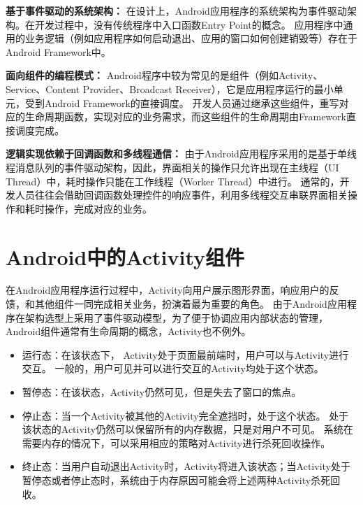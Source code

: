 \textbf{基于事件驱动的系统架构：}
在设计上，Android应用程序的系统架构为事件驱动架构。在开发过程中，没有传统程序中入口函数Entry Point的概念。
应用程序中通用的业务逻辑（例如应用程序如何启动退出、应用的窗口如何创建销毁等）存在于Android Framework中。

\textbf{面向组件的编程模式：}
Android程序中较为常见的是组件（例如Activity、Service、Content Provider、Broadcast Receiver），它是应用程序运行的最小单元，受到Android Framework的直接调度。
开发人员通过继承这些组件，重写对应的生命周期函数，实现对应的业务需求，而这些组件的生命周期由Framework直接调度完成。

\textbf{逻辑实现依赖于回调函数和多线程通信：}
由于Android应用程序采用的是基于单线程消息队列的事件驱动架构，因此，界面相关的操作只允许出现在主线程（UI Thread）中，耗时操作只能在工作线程（Worker Thread）中进行。
通常的，开发人员往往会借助回调函数处理控件的响应事件，利用多线程交互串联界面相关操作和耗时操作，完成对应的业务。


\section{Android中的Activity组件}



在Android应用程序运行过程中，Activity向用户展示图形界面，响应用户的反馈，和其他组件一同完成相关业务，扮演着最为重要的角色。%
由于Android应用程序在架构选型上采用了事件驱动模型，为了便于协调应用内部状态的管理，Android组件通常有生命周期的概念，Activity也不例外。




\begin{itemize}
		\setlength{\itemsep}{-5pt}
		
	\item 运行态：在该状态下， Activity处于页面最前端时，用户可以与Activity进行交互。
	一般的，用户可见并可以进行交互的Activity均处于这个状态。
	
	\item 暂停态：在该状态，Activity仍然可见，但是失去了窗口的焦点。
	\item 停止态：当一个Activity被其他的Activity完全遮挡时，处于这个状态。
	处于该状态的Activity仍然可以保留所有的内存数据，只是对用户不可见。
	系统在需要内存的情况下，可以采用相应的策略对Activity进行杀死回收操作。
	
	\item 终止态：当用户自动退出Activity时，Activity将进入该状态；当Activity处于暂停态或者停止态时，系统由于内存原因可能会将上述两种Activity杀死回收。
\end{itemize}



